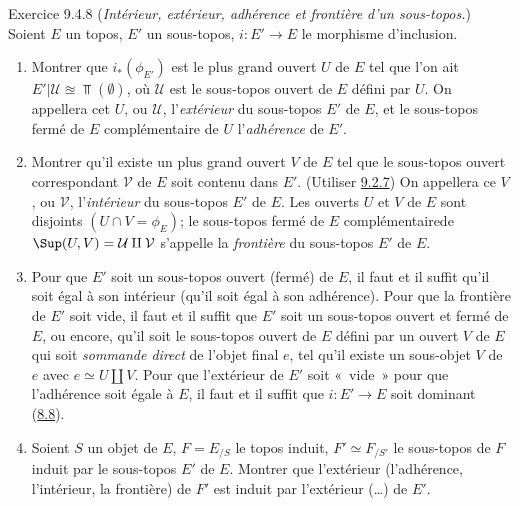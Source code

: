 \begin{enonce*}[remark]{Exercice 9.4.8}
(\emph{Intérieur, extérieur, adhérence et frontière d'un
sous-topos.}) Soient $E$ un topos, $E'$ un sous-topos,
$i:E'\rightarrow E$ le morphisme d'inclusion.
\begin{enumerate}
\renewcommand{\theenumi}{\alph{enumi}}
\renewcommand{\labelenumi}{\theenumi)}
\item Montrer que $i_{\ast}(\phi_{E'})$ est le plus grand ouvert $U$
de $E$ tel que l'on ait $E'| \mathcal{U} \approxeq \Top(∅)$, où
$\mathcal{U}$ est le sous-topos ouvert de $E$ défini par $U$. On
appellera cet $U$, ou $\mathcal{U}$, l'\emph{extérieur} du
sous-topos $E'$ de $E$, et le sous-topos fermé de $E$ complémentaire
de $U$ l'\emph{adhérence} de $E'$.

\item Montrer qu'il existe un plus grand ouvert $V$ de $E$ tel que le
sous-topos ouvert correspondant $\mathcal{V}$ de $E$ soit contenu
dans $E'$. (Utiliser \hyperref[IV.exer9.2.7]{9.2.7}) On appellera ce $V$, ou
$\mathcal{V}$, l'\emph{intérieur} du sous-topos $E'$ de $E$. Les
ouverts $U$ et $V$ de $E$ sont disjoints $(U\cap V=\phi_E)$; le
sous-topos fermé de $E$ complémentaire\pageoriginale de
$\Sup(U,V)=\mathcal{U}\amalg \mathcal{V}$ s'appelle la
\emph{frontière} du sous-topos $E'$ de $E$.

\item Pour que $E'$ soit un sous-topos ouvert (\resp fermé) de $E$, il
faut et il suffit qu'il soit égal à son intérieur (\resp qu'il soit
égal à son adhérence). Pour que la frontière de $E'$ soit vide, il
faut et il suffit que $E'$ soit un sous-topos ouvert et fermé de
$E$, ou encore, qu'il soit le sous-topos ouvert de $E$ défini par un
ouvert $V$ de $E$ qui soit \emph{sommande direct} de l'objet final
$e$, \ie tel qu'il existe un sous-objet $V$ de $e$ avec $e\simeq
U\amalg V$. Pour que l'extérieur de $E'$ soit « vide »  \ie pour
que l'adhérence soit égale à $E$, il faut et il suffit que
$i:E'\rightarrow E$ soit dominant (\hyperref[IV.exer8.8]{8.8}).

\item Soient $S$ un objet de $E$, $F=E_{/S}$ le topos induit, $F'\simeq
F_{/S'}$ le sous-topos de $F$ induit par le sous-topos $E'$ de $E$.
Montrer que l'extérieur (\resp l'adhérence, \resp
l'intérieur, \resp
la frontière) de $F'$ est induit par l'extérieur (\resp\ldots) de
$E'$.
\end{enumerate}
\end{enonce*}

